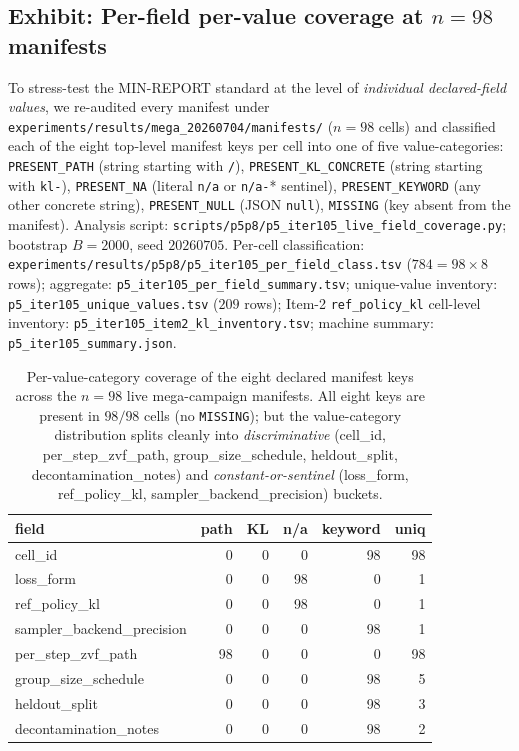 \subsection{Exhibit: Per-field per-value coverage at $n{=}98$ manifests}
\label{sec:p5-iter105-coverage}

To stress-test the MIN-REPORT standard at the level of \emph{individual
declared-field values}, we re-audited every manifest under
\texttt{experiments/results/mega\_20260704/manifests/} ($n{=}98$ cells)
and classified each of the eight top-level manifest keys per cell into
one of five value-categories: \texttt{PRESENT\_PATH} (string starting with
\texttt{/}), \texttt{PRESENT\_KL\_CONCRETE} (string starting with
\texttt{kl-}), \texttt{PRESENT\_NA} (literal \texttt{n/a} or
\texttt{n/a-}* sentinel), \texttt{PRESENT\_KEYWORD} (any other concrete
string), \texttt{PRESENT\_NULL} (JSON \texttt{null}), \texttt{MISSING}
(key absent from the manifest). Analysis script:
\texttt{scripts/p5p8/p5\_iter105\_live\_field\_coverage.py}; bootstrap
$B{=}2000$, seed $20260705$. Per-cell classification:
\texttt{experiments/results/p5p8/p5\_iter105\_per\_field\_class.tsv}
($784{=}98{\times}8$ rows); aggregate:
\texttt{p5\_iter105\_per\_field\_summary.tsv}; unique-value inventory:
\texttt{p5\_iter105\_unique\_values.tsv} ($209$ rows); Item-2
\texttt{ref\_policy\_kl} cell-level inventory:
\texttt{p5\_iter105\_item2\_kl\_inventory.tsv}; machine summary:
\texttt{p5\_iter105\_summary.json}.

\begin{table}[t]
\centering
\caption{Per-value-category coverage of the eight declared manifest keys
across the $n{=}98$ live mega-campaign manifests. All eight keys are
present in $98/98$ cells (no \texttt{MISSING}); but the value-category
distribution splits cleanly into \emph{discriminative} (cell_id,
per\_step\_zvf\_path, group\_size\_schedule, heldout\_split,
decontamination\_notes) and \emph{constant-or-sentinel} (loss\_form,
ref\_policy\_kl, sampler\_backend\_precision) buckets.}
\label{tab:p5-iter105-coverage}
\small
\begin{tabular}{@{}lrrrrr@{}}
\toprule
field & path & KL & n/a & keyword & uniq \\
\midrule
cell\_id                     &   0 &   0 &  0 &  98 &  98 \\
loss\_form                   &   0 &   0 & 98 &   0 &   1 \\
ref\_policy\_kl               &   0 &   0 & 98 &   0 &   1 \\
sampler\_backend\_precision   &   0 &   0 &  0 &  98 &   1 \\
per\_step\_zvf\_path          &  98 &   0 &  0 &   0 &  98 \\
group\_size\_schedule         &   0 &   0 &  0 &  98 &   5 \\
heldout\_split               &   0 &   0 &  0 &  98 &   3 \\
decontamination\_notes       &   0 &   0 &  0 &  98 &   2 \\
\bottomrule
\end{tabular}
\end{table}

